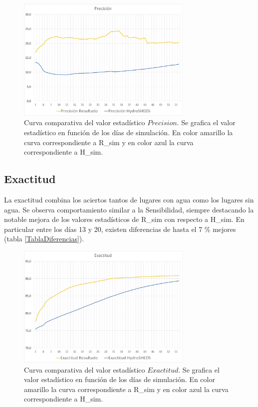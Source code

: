 \documentclass[10pt,a4paper, twoside]{report}
\begin{document}
\begin{figure}[H]
   \centering      
   \includegraphics[width=0.75\textwidth]{imagenes/Precision.jpg}
 \caption{Curva comparativa del valor estadístico $Precision$. Se grafica el valor estadístico en función de los días de simulación. En color amarillo la curva correspondiente a R\_sim y en color azul la curva correspondiente a H\_sim.}
 \label{Precision}
\end{figure}

\subsection{Exactitud}

La exactitud combina los aciertos tantos de lugares con agua como los lugares sin agua. Se observa comportamiento similar a la Sensibilidad, siempre destacando la notable mejora de los valores estadísticos de R\_sim con respecto a H\_sim. En particular entre los días 13 y 20, existen diferencias de hasta el 7 \% mejores (tabla \ref{TablaDiferencias}).

\begin{figure}[H]
   \centering      
   \includegraphics[width=0.75\textwidth]{imagenes/Exactitud.jpg}
 \caption{Curva comparativa del valor estadístico $Exactitud$. Se grafica el valor estadístico en función de los días de simulación. En color amarillo la curva correspondiente a R\_sim y en color azul la curva correspondiente a H\_sim.}
 \label{Exactitud}
\end{figure}
\end{document}

